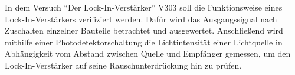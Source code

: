 In dem Versuch \enquote{Der Lock-In-Verstärker} V303 soll die Funktionsweise eines Lock-In-Verstärkers verifiziert werden.
Dafür wird das Ausgangssignal nach Zuschalten einzelner Bauteile betrachtet und ausgewertet. Anschließend wird
mithilfe einer Photodetektorschaltung die Lichtintensität einer Lichtquelle in Abhängigkeit vom Abstand zwischen Quelle und Empfänger gemessen, um den Lock-In-Verstärker auf seine Rauschunterdrückung hin zu prüfen.
